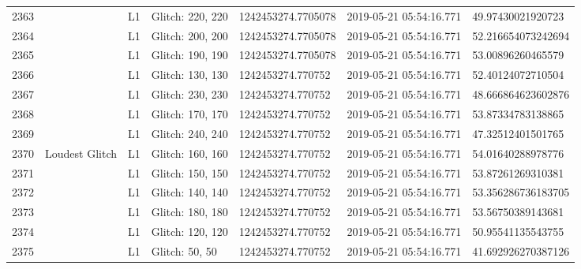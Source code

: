 \begin{longtable}{lllllll}
2363 &                                                    &       L1 &  Glitch: 220, 220 &  1242453274.7705078 &  2019-05-21 05:54:16.771 &   49.97430021920723 \\
2364 &                                                    &       L1 &  Glitch: 200, 200 &  1242453274.7705078 &  2019-05-21 05:54:16.771 &  52.216654073242694 \\
2365 &                                                    &       L1 &  Glitch: 190, 190 &  1242453274.7705078 &  2019-05-21 05:54:16.771 &   53.00896260465579 \\
2366 &                                                    &       L1 &  Glitch: 130, 130 &   1242453274.770752 &  2019-05-21 05:54:16.771 &   52.40124072710504 \\
2367 &                                                    &       L1 &  Glitch: 230, 230 &   1242453274.770752 &  2019-05-21 05:54:16.771 &  48.666864623602876 \\
2368 &                                                    &       L1 &  Glitch: 170, 170 &   1242453274.770752 &  2019-05-21 05:54:16.771 &   53.87334783138865 \\
2369 &                                                    &       L1 &  Glitch: 240, 240 &   1242453274.770752 &  2019-05-21 05:54:16.771 &   47.32512401501765 \\
2370 &                                     Loudest Glitch &       L1 &  Glitch: 160, 160 &   1242453274.770752 &  2019-05-21 05:54:16.771 &   54.01640288978776 \\
2371 &                                                    &       L1 &  Glitch: 150, 150 &   1242453274.770752 &  2019-05-21 05:54:16.771 &   53.87261269310381 \\
2372 &                                                    &       L1 &  Glitch: 140, 140 &   1242453274.770752 &  2019-05-21 05:54:16.771 &  53.356286736183705 \\
2373 &                                                    &       L1 &  Glitch: 180, 180 &   1242453274.770752 &  2019-05-21 05:54:16.771 &   53.56750389143681 \\
2374 &                                                    &       L1 &  Glitch: 120, 120 &   1242453274.770752 &  2019-05-21 05:54:16.771 &   50.95541135543755 \\
2375 &                                                    &       L1 &    Glitch: 50, 50 &   1242453274.770752 &  2019-05-21 05:54:16.771 &  41.692926270387126 \\

\end{longtable}
